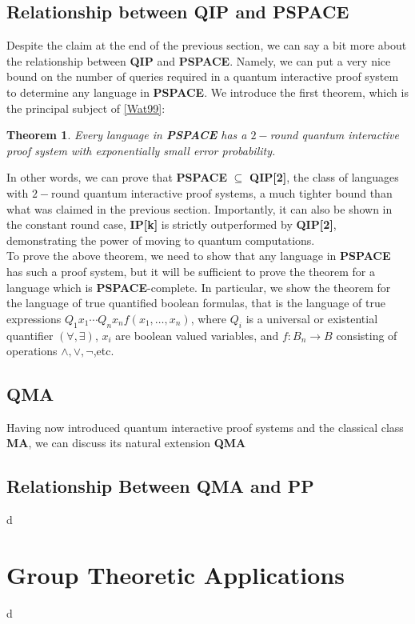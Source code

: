 \documentclass[12pt]{article}
\newtheorem*{thm}{Theorem}
\begin{document}
	\subsection{Relationship between QIP and PSPACE}
	Despite the claim at the end of the previous section, we can say a bit more about the relationship between \textbf{QIP} and \textbf{PSPACE}. Namely, we can put a very nice bound on the number of queries required in a quantum interactive proof system to determine any language in \textbf{PSPACE}. We introduce the first theorem, which is the principal subject of \hyperref[wat99]{[Wat99]}:
	\begin{thm}
		Every language in \textbf{PSPACE} has a $2-$round quantum interactive proof system with exponentially small error probability. 
	\end{thm}

	In other words, we can prove that \textbf{PSPACE} $\subseteq$ \textbf{QIP[2]}, the class of languages with $2-$round quantum interactive proof systems, a much tighter bound than what was claimed in the previous section. Importantly, it can also be shown in the constant round case, \textbf{IP[k]} is strictly outperformed by \textbf{QIP[2]}, demonstrating the power of moving to quantum computations.\\
	
	To prove the above theorem, we need to show that any language in \textbf{PSPACE} has such a proof system, but it will be sufficient to prove the theorem for a language which is \textbf{PSPACE}-complete. In particular, we show the theorem for the language of true quantified boolean formulas, that is the language of true expressions $Q_1x_1\cdots Q_nx_nf(x_1,\dots,x_n)$, where $Q_i$ is a universal or existential quantifier $(\forall,\exists)$, $x_i$ are boolean valued variables, and $f:B_n\to B$ consisting of operations $\wedge,\vee,\neg$,etc. 
     \subsection{QMA}
    Having now introduced quantum interactive proof systems and the classical class \textbf{MA}, we can discuss its natural extension \textbf{QMA} 
    
    \subsection{Relationship Between QMA and PP}d
    
    \section{Group Theoretic Applications}
    d
\end{document}
